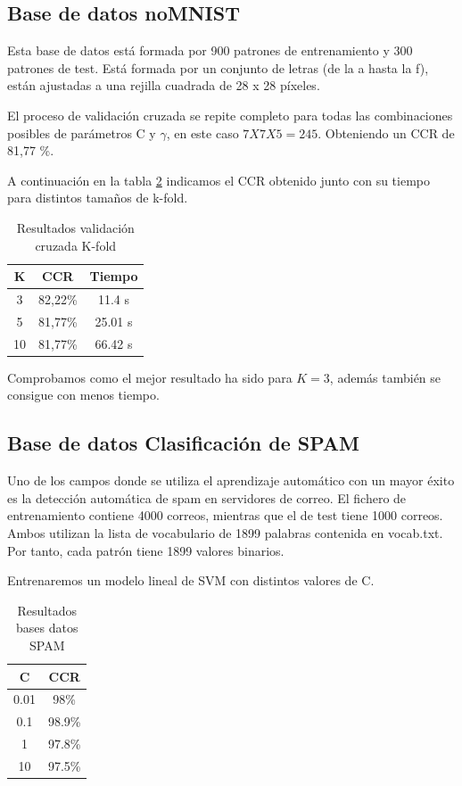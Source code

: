 \subsection{Base de datos noMNIST}
Esta base de datos está formada por 900 patrones de entrenamiento y 300 patrones de test. Está formada por un conjunto de letras (de la a hasta la f), están ajustadas a una rejilla cuadrada de 28 x 28 píxeles.

El proceso de validación cruzada se repite completo para todas las combinaciones posibles de parámetros C y $\gamma$, en este caso $ 7X7X5 = 245$. Obteniendo un CCR de 81,77 \%.

A continuación en la tabla \ref{k_fold} indicamos el CCR obtenido junto con su tiempo para distintos tamaños de k-fold.
\begin{table}[H]
\centering
	\begin{tabular}{|c|c|c|}
	\hline 
	K & CCR & Tiempo \\ 
	\hline 
	3 & 82,22\% & 11.4 s \\ 
	\hline 
	5 & 81,77\% & 25.01 s \\ 
	\hline 
	10 & 81,77\% & 66.42 s \\
	\hline
	\end{tabular}
	\caption{Resultados validación cruzada K-fold}
	\label{k_fold}
\end{table}

Comprobamos como el mejor resultado ha sido para $K = 3$, además también se consigue con menos tiempo.


\subsection{Base de datos Clasificación de SPAM}
Uno de los campos donde se utiliza el aprendizaje automático con un mayor éxito es la detección automática de spam en servidores de correo. El fichero de entrenamiento contiene 4000 correos, mientras que el de test tiene 1000 correos. Ambos utilizan la lista de vocabulario de 1899 palabras contenida en vocab.txt. Por tanto, cada patrón tiene 1899 valores binarios.

Entrenaremos un modelo lineal de SVM con distintos valores de C.
\begin{table}[H]
\centering
	\begin{tabular}{|c|c|}
	\hline 
	C & CCR \\ 
	\hline 
	0.01 & 98\% \\ 
	\hline 
	0.1 & 98.9\% \\ 
	\hline 
	1 & 97.8\% \\
	\hline
	10 & 97.5\% \\
	\hline
	\end{tabular}
	\caption{Resultados bases datos SPAM}
	\label{k_fold}
\end{table}